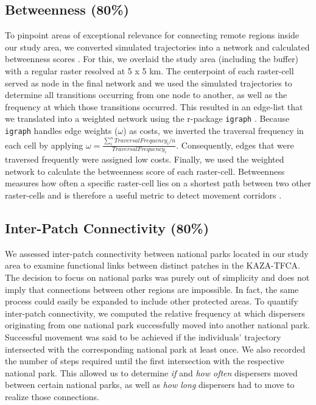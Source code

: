 \documentclass[abstract=on,10pt,a4paper,bibliography=totocnumbered]{article}
\begin{document}
\subsection{Betweenness (80\%)}
To pinpoint areas of exceptional relevance for connecting remote regions inside
our study area, we converted simulated trajectories into a network and
calculated betweenness scores \citep{BastilleRousseau.2018}. For this, we
overlaid the study area (including the buffer) with a regular raster resolved at
5 x 5 km. The centerpoint of each raster-cell served as node in the final
network and we used the simulated trajectories to determine all transitions
occurring from one node to another, as well as the frequency at which those
transitions occurred. This resulted in an edge-list that we translated into a
weighted network using the r-package {\tt igraph} \citep{Gabor.2006}. Because
{\tt igraph} handles edge weights (\(\omega\)) as costs, we inverted the
traversal frequency in each cell by applying \(\omega = \frac{\sum_i^n{Traversal
Frequency_i}/n}{Traversal Frequency_i}\). Consequently, edges that were
traversed frequently were assigned low costs. Finally, we used the weighted
network to calculate the betweenness score of each raster-cell. Betweenness
measures how often a specific raster-cell lies on a shortest path between two
other raster-cells and is therefore a useful metric to detect movement corridors
\citep{BastilleRousseau.2018}.

\subsection{Inter-Patch Connectivity (80\%)}
We assessed inter-patch connectivity between national parks located in our study
area to examine functional links between distinct patches in the KAZA-TFCA. The
decision to focus on national parks was purely out of simplicity and does not
imply that connections between other regions are impossible. In fact, the same
process could easily be expanded to include other protected areas. To quantify
inter-patch connectivity, we computed the relative frequency at which dispersers
originating from one national park successfully moved into another national
park. Successful movement was said to be achieved if the individuals' trajectory
intersected with the corresponding national park at least once. We also recorded
the number of steps required until the first intersection with the respective
national park. This allowed us to determine \textit{if} and \textit{how often}
dispersers moved between certain national parks, as well as \textit{how long}
dispersers had to move to realize those connections.
\end{document}
